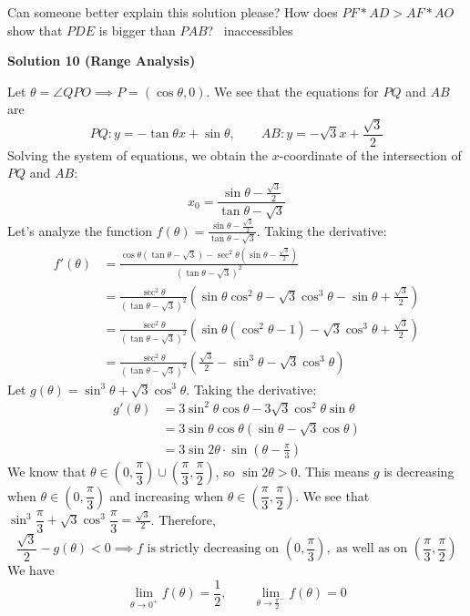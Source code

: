 \begin{enumerate}
 Can someone better explain this solution please? How does $PF*AD > AF*AO$ show that $PDE$ is bigger than $PAB$? ~inaccessibles

 



\textbf{Solution 10 (Range Analysis)}

Let $\theta=\angle QPO\implies P=(\cos\theta, 0)$. We see that the equations for $PQ$ and $AB$ are
 \[PQ: y=-\tan\theta x+\sin \theta,\qquad AB: y=-\sqrt{3}x+\frac{\sqrt{3}}{2}\]Solving the system of equations, we obtain the $x$-coordinate of the intersection of $PQ$ and $AB$:
 \[x_0=\frac{\sin\theta -\frac{\sqrt{3}}{2}}{\tan\theta -\sqrt{3}}\]Let's analyze the function $f(\theta)=\frac{\sin\theta -\frac{\sqrt{3}}{2}}{\tan\theta -\sqrt{3}}$. Taking the derivative:\begin{align*}f'(\theta)&=\frac{\cos\theta(\tan\theta -\sqrt{3})-\sec^2\theta(\sin\theta -\frac{\sqrt{3}}{2})}{(\tan\theta -\sqrt{3})^2}\\&=\frac{\sec^2\theta}{(\tan\theta -\sqrt{3})^2}\left(\sin\theta\cos^2\theta-\sqrt{3}\cos^3\theta-\sin\theta+\frac{\sqrt{3}}{2}\right)\\&=\frac{\sec^2\theta}{(\tan\theta -\sqrt{3})^2}\left(\sin\theta(\cos^2\theta-1)-\sqrt{3}\cos^3\theta+\frac{\sqrt{3}}{2}\right)\\&=\frac{\sec^2\theta}{(\tan\theta -\sqrt{3})^2}\left(\frac{\sqrt{3}}{2}-\sin^3\theta-\sqrt{3}\cos^3\theta\right)\end{align*}
Let $g(\theta)=\sin^3\theta+\sqrt{3}\cos^3\theta$. Taking the derivative:\begin{align*}g'(\theta)&=3\sin^2\theta\cos\theta-3\sqrt{3}\cos^2\theta\sin\theta\\&=3\sin\theta\cos\theta(\sin\theta-\sqrt{3}\cos\theta)\\&=3\sin{2\theta}\cdot\sin{\left(\theta -\frac{\pi}{3}\right)}\end{align*}
We know that $\theta\in \left(0,\dfrac \pi 3\right)\cup \left(\dfrac \pi 3,\dfrac \pi 2\right)$, so $\sin 2\theta > 0$. This means $g$ is decreasing when $\theta\in\left(0,\dfrac\pi 3\right)$ and increasing when $\theta\in\left(\dfrac\pi 3,\dfrac\pi 2\right)$. We see that $\sin^3\dfrac \pi 3+\sqrt{3}\cos^3\dfrac \pi 3=\frac{\sqrt{3}}{2}$. Therefore, 
 \[\frac{\sqrt{3}}{2}-g(\theta)< 0\implies f\text{ is strictly decreasing on }\left(0,\dfrac\pi 3\right),\text{ as well as on } \left(\dfrac\pi 3, \dfrac\pi 2\right)\]We have
 \[\lim_{\theta\to 0^+}f(\theta)=\dfrac 12, \qquad \lim_{\theta\to \frac{\pi}{2}^-}f(\theta)=0\]


\end{enumerate}
